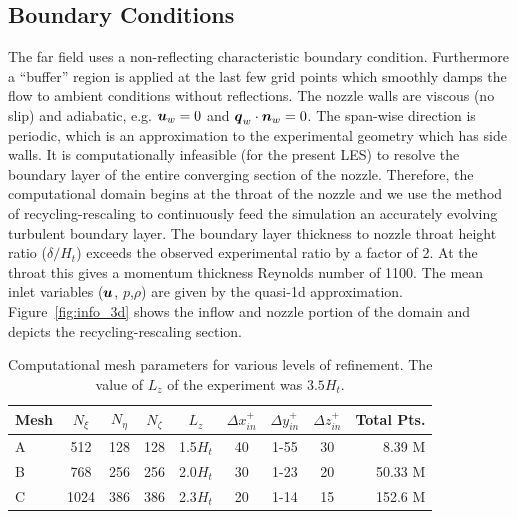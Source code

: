 \documentclass[]{aiaa-tc}%
\def\bgk#1{\mbox{\boldmath $#1$}}
\def\vec#1{\bgk{ #1}}
\begin{document}


\subsection{Boundary Conditions}

The far field uses a non-reflecting characteristic boundary condition\cite{Poinsot:92}.  Furthermore a ``buffer'' region is applied at the last few grid points which smoothly damps the flow to ambient conditions without reflections.  The nozzle walls are viscous (no slip) and adiabatic, e.g. $\vec{u}_w=0$ and $\vec{q}_w\cdot\vec{n}_w = 0$.  The span-wise direction is periodic, which is an approximation to the experimental geometry which has side walls.  It is computationally infeasible (for the present LES) to resolve the boundary layer of the entire converging section of the nozzle.  Therefore, the computational domain begins at the throat of the nozzle and we use the method of recycling-rescaling\cite{Lund:98,Urban:01} to continuously feed the simulation an accurately evolving turbulent boundary layer.  The boundary layer thickness to nozzle throat height ratio ($\delta/H_t$) exceeds the observed experimental ratio by a factor of 2.  At the throat this gives a momentum thickness Reynolds number of 1100.  The mean inlet variables ($\vec{u}$, $p$,$\rho$) are given by the quasi-1d approximation.  Figure~\ref{fig:info_3d} shows the inflow and nozzle portion of the domain and depicts the recycling-rescaling section.


\begin{table}[!h]

\begin{center}
	\caption{Computational mesh parameters for various levels of refinement.  The value of $L_z$ of the experiment\cite{Papam:10} was $3.5H_t$.
	\label{tbl:mesh}
	}
	\begin{tabular}{lcccccccr}
	\hline 
	Mesh & $N_{\xi}$ & $N_{\eta}$ & $N_{\zeta}$ & $L_z$ & $\Delta x^+_{in}$ & $\Delta y^+_{in}$ & $\Delta z^+_{in}$ & Total Pts.\\
	\hline 
	A & 512 & 128 &              128            & 1.5$H_t$ & 40 & 1-55 & 30 & 8.39 M \\
	B & 768 & 256 &              256           & 2.0$H_t$ & 30 & 1-23 & 20 & 50.33 M \\
	C & 1024 & 386 &              386            & 2.3$H_t$ & 20 & 1-14 & 15 & 152.6 M
	\end{tabular}
\end{center}
\end{table}
\end{document}
